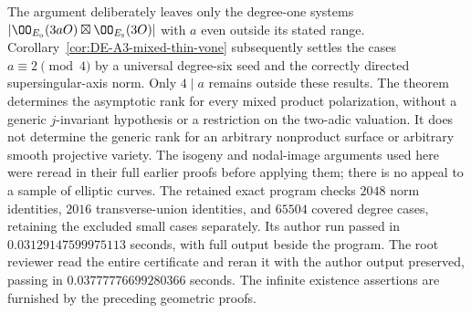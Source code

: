 \begin{remark}
\label{rem:DE-A3-mixed-product-scope}
The argument deliberately leaves only the degree-one systems
$|\OO_{E_{\rm o}}(3aO)\boxtimes\OO_{E_{\rm s}}(3O)|$ with
$a$ even outside its stated range.
Corollary~\ref{cor:DE-A3-mixed-thin-vone} subsequently settles
the cases $a\equiv2\pmod4$ by a universal degree-six seed and
the correctly directed supersingular-axis norm.
Only $4\mid a$ remains outside these results.
The theorem determines the asymptotic
rank for every mixed product polarization, without a generic
$j$-invariant hypothesis or a restriction on the two-adic valuation.
It does not determine the generic rank for an arbitrary
nonproduct surface or arbitrary smooth projective variety.
The isogeny and nodal-image arguments used here were reread in
their full earlier proofs before applying them; there is no
appeal to a sample of elliptic curves.
The retained exact program
checks $2048$ norm identities, $2016$ transverse-union identities,
and $65504$ covered degree cases, retaining the excluded small cases
separately.  Its author run passed in $0.03129147599975113$ seconds,
with full output beside the program.  The root reviewer read the entire
certificate and reran it with the author output preserved, passing in
$0.03777776699280366$ seconds.  The infinite existence assertions
are furnished by the preceding geometric proofs.
\end{remark}
